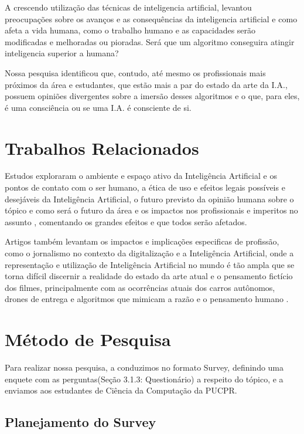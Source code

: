 \documentclass[onecolumn,12pt]{asme2ej}
\begin{document}
A crescendo utilização das técnicas de inteligencia artificial, levantou preocupações sobre os avanços e as consequências da inteligencia artificial e como afeta a vida humana, como o trabalho humano e as capacidades serão modificadas e melhoradas ou pioradas. Será que um algoritmo conseguira atingir inteligencia superior a humana?

Nossa pesquisa identificou que, contudo, até mesmo os profissionais mais próximos da área e estudantes, que estão mais a par do estado da arte da I.A., possuem opiniões divergentes sobre a imersão desses algoritmos e o que, para eles, é uma consciência ou se uma I.A. é consciente de si.

\section{Trabalhos Relacionados} 

Estudos\cite{survey_1}\cite{survey_2} exploraram o ambiente e espaço ativo da Inteligência Artificial e os pontos de contato com o ser humano,\cite{survey_3}\cite{survey_4} a ética de uso e efeitos legais possíveis e desejáveis da Inteligência Artificial, o futuro previsto da opinião humana sobre o tópico e como será o futuro da área e os impactos nos profissionais e imperitos no assunto \cite{survey_5}\cite{survey_6}, comentando os grandes efeitos e que todos serão afetados.

Artigos também levantam os impactos e implicações especificas de profissão, como o jornalismo no contexto da digitalização e a Inteligência Artificial, onde a representação e utilização de Inteligência Artificial no mundo é tão ampla que se torna difícil discernir a realidade do estado da arte atual e o pensamento fictício dos filmes, principalmente com as ocorrências atuais dos carros autônomos, drones de entrega e algoritmos que mimicam a razão e o pensamento humano \cite{survey_7}.

\section{Método de Pesquisa} 

Para realizar nossa pesquisa, a conduzimos no formato Survey, definindo uma enquete com as perguntas(Seção 3.1.3: Questionário) a respeito do tópico, e a enviamos aos estudantes de Ciência da Computação da PUCPR.

\subsection{Planejamento do Survey} 
 
\end{document}
